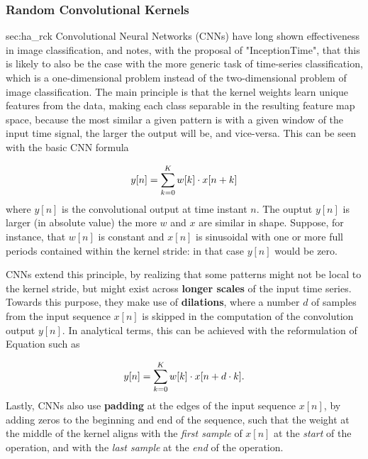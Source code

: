 \subsubsection{Random Convolutional Kernels}{sec:ha_rck}
Convolutional Neural Networks (CNNs) have long shown effectiveness in image classification, and \cite{Fawaz2020} notes, with the proposal of "InceptionTime", that this is likely to also be the case with the more generic task of time-series classification, which is a one-dimensional problem instead of the two-dimensional problem of image classification.
The main principle is that the kernel weights learn unique features from the data, making each class separable in the resulting feature map space, because the most similar a given pattern is with a given window of the input time signal, the larger the output will be, and vice-versa. This can be seen with the basic CNN formula

\begin{equation}\label{eq:basic_cnn_eq}
y[n] = \sum\sb{k=0}\sp{K} w[k] \cdot x[n+k]
\end{equation}
where $y[n]$ is the convolutional output at time instant $n$. The ouptut $y[n]$ is larger (in absolute value) the more $w$ and $x$ are similar in shape. Suppose, for instance, that $w[n]$ is constant and $x[n]$ is sinusoidal with one or more full periods contained within the kernel stride: in that case $y[n]$ would be zero.

CNNs extend this principle, by realizing that some patterns might not be local to the kernel stride, but might exist across \textbf{longer scales} of the input time series. Towards this purpose, they make use of \textbf{dilations}, where a number $d$ of samples from the input sequence $x[n]$ is skipped in the computation of the convolution
output $y[n]$. In analytical terms, this can be achieved with the reformulation of Equation \label{eq:basic_cnn_eq} such as

\begin{equation}\label{eq:dil_cnn_eq}
y[n] = \sum\sb{k=0}\sp{K} w[k] \cdot x[n+ d \cdot k].
\end{equation}
Lastly, CNNs also use \textbf{padding} at the edges of the input sequence $x[n]$, by adding zeros to the beginning and end of the sequence, such that the weight at the middle of the kernel aligns with the \emph{first sample} of $x[n]$ at the \emph{start} of the operation, and with the \emph{last sample} at the \emph{end} of the operation.


